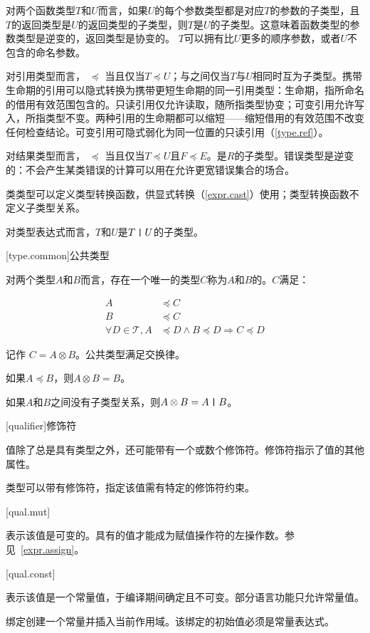 \pnum
对两个函数类型$T$和$U$而言，如果$U$的每个参数类型都是对应$T$的参数的子类型，且$T$的返回类型是$U$的返回类型的子类型，则$T$是$U$的子类型。\enternote 这意味着函数类型的参数类型是逆变的，返回类型是协变的。 \exitnote $T$可以拥有比$U$更多的顺序参数，或者$U$不包含的命名参数。

\pnum
对引用类型而言， $\preceq$ 当且仅当$T \preceq U$；与之间仅当$T$与$U$相同时互为子类型。携带生命期的引用可以隐式转换为携带更短生命期的同一引用类型：生命期，指所命名的借用有效范围包含的。\enternote 只读引用仅允许读取，随所指类型协变；可变引用允许写入，所指类型不变。两种引用的生命期都可以缩短——缩短借用的有效范围不改变任何检查结论。可变引用可隐式弱化为同一位置的只读引用（\ref{type.ref}）。 \exitnote

\pnum
对结果类型而言， $\preceq$ 当且仅当$T \preceq U$且$F \preceq E$。是$R$的子类型。\enternote 错误类型是逆变的：不会产生某类错误的计算可以用在允许更宽错误集合的场合。 \exitnote

\pnum
类类型可以定义类型转换函数，供显式转换（\ref{expr.cast}）使用；类型转换函数不定义子类型关系。

\pnum
对类型表达式而言，$T$和$U$是$T\mathbin{\texttt{|}}U$的子类型。

[type.common]{公共类型}

\pnum
对两个类型$A$和$B$而言，存在一个唯一的类型$C$称为$A$和$B$的。$C$满足：

\begin{equation}
\begin{aligned}
    A &\preceq C \\
    B &\preceq C \\
    \forall D \in \mathcal{T}, A &\preceq D \land B \preceq D \Rightarrow C \preceq D
\end{aligned}
\end{equation}

记作 $C = A \otimes B$。公共类型满足交换律。

\pnum
如果$A \preceq B$，则$A \otimes B = B$。

\pnum
如果$A$和$B$之间没有子类型关系，则$A \otimes B = A \mathbin{\texttt{|}} B$。

[qualifier]{修饰符}

\pnum
值除了总是具有类型之外，还可能带有一个或数个修饰符。修饰符指示了值的其他属性。

\pnum
类型可以带有修饰符，指定该值需有特定的修饰符约束。

[qual.mut]{}

\pnum
{}表示该值是可变的。具有的值才能成为赋值操作符的左操作数。参见~\ref{expr.assign}。

[qual.const]{}

\pnum
{}表示该值是一个常量值，于编译期间确定且不可变。部分语言功能只允许常量值。

\pnum
{}绑定创建一个常量并插入当前作用域。该绑定的初始值必须是常量表达式。
